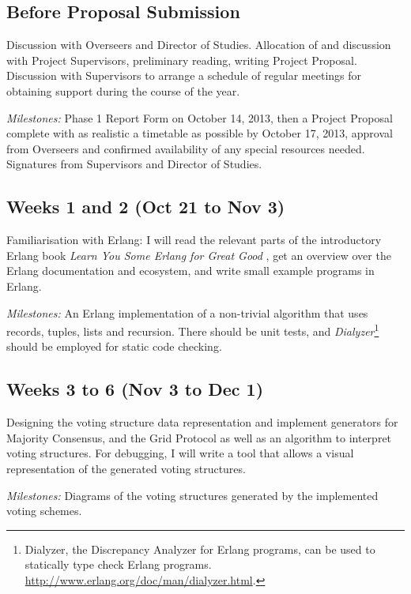 \documentclass[12pt]{scrartcl}
\begin{document}
\subsection{Before Proposal Submission%
  \label{before-proposals-submission}%
}

Discussion with Overseers and Director of Studies. Allocation of and discussion with Project Supervisors, preliminary reading, writing Project Proposal. Discussion with Supervisors to arrange a schedule of regular meetings for obtaining support during the course of the year.

\emph{Milestones:} Phase 1 Report Form on October 14, 2013, then a Project Proposal complete with as realistic a timetable as possible by October 17, 2013, approval from Overseers and confirmed availability of any special resources needed. Signatures from Supervisors and Director of Studies.


\subsection{Weeks 1 and 2 (Oct 21 to Nov 3)%
  \label{weeks-1-and-2-oct-21-to-nov-3}%
}

Familiarisation with Erlang: I will read the relevant parts of the introductory Erlang book \emph{Learn You Some Erlang for Great Good} \cite{lysefgg}, get an overview over the Erlang documentation and ecosystem, and write small example programs in Erlang.

\emph{Milestones:} An Erlang implementation of a non-trivial algorithm that uses records, tuples, lists and recursion. There should be unit tests, and \emph{Dialyzer}\footnote{Dialyzer, the Discrepancy Analyzer for Erlang programs, can be used to statically type check Erlang programs. \url{http://www.erlang.org/doc/man/dialyzer.html}.} should be employed for static code checking.


\subsection{Weeks 3 to 6 (Nov 3 to Dec 1)%
  \label{weeks-3-to-6-nov-3-to-dec-1}%
}

Designing the voting structure data representation and implement generators for Majority Consensus, and the Grid Protocol as well as an algorithm to interpret voting structures. For debugging, I will write a tool that allows a visual representation of the generated voting structures.

\emph{Milestones:} Diagrams of the voting structures generated by the implemented voting schemes.
\end{document}
